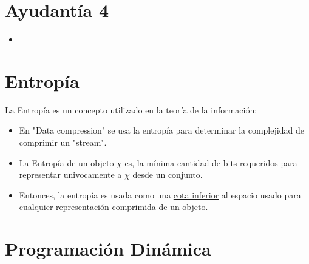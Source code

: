 \documentclass[12pt]{article}
\begin{document}
\section{Ayudantía 4}

\begin{itemize}
  \item 
\end{itemize}

\section{Entropía}

La Entropía es un concepto utilizado en la teoría de la información:

\begin{itemize}
  \item En "Data compression" se usa la entropía para determinar la complejidad de comprimir un "stream".
  \item La Entropía de un objeto $\chi $ es, la mínima cantidad de bits requeridos para representar univocamente a $\chi $ desde un conjunto.
  \item Entonces, la entropía es usada como una \underline{cota inferior} al espacio usado para cualquier representación comprimida de un objeto.
\end{itemize}

\section{Programación Dinámica}
\end{document}
